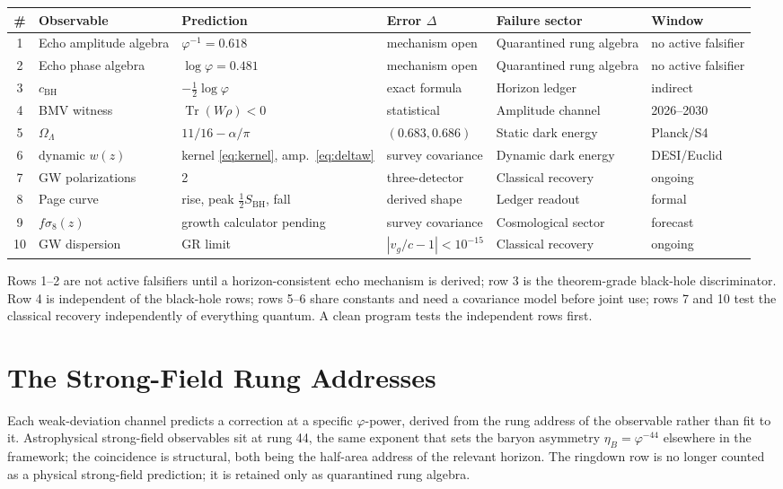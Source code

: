 \documentclass[11pt,letterpaper]{article}
\theoremstyle{definition}
\newcommand{\phiG}{\varphi}
\newcommand{\BH}{\mathrm{BH}}
\newcommand{\half}{\tfrac{1}{2}}
\DeclareMathOperator{\Tr}{Tr}
\begin{document}
\begin{center}
\footnotesize
\renewcommand{\arraystretch}{1.2}
\begin{tabular}{clp{2.9cm}p{2.1cm}p{2.3cm}l}
\toprule
\# & Observable & Prediction & Error $\Delta$
& Failure sector & Window \\
\midrule
1 & Echo amplitude algebra & $\phiG^{-1}=0.618$ & mechanism open
& Quarantined rung algebra & no active falsifier \\
2 & Echo phase algebra & $\log\phiG=0.481$ & mechanism open
& Quarantined rung algebra & no active falsifier \\
3 & $c_\BH$ & $-\half\log\phiG$ & exact formula
& Horizon ledger & indirect \\
4 & BMV witness & $\Tr(W\rho)<0$ & statistical
& Amplitude channel & 2026--2030 \\
5 & $\Omega_\Lambda$ & $11/16-\alpha/\pi$ & $(0.683,0.686)$
& Static dark energy & Planck/S4 \\
6 & dynamic $w(z)$ & kernel \eqref{eq:kernel}, amp.\
\eqref{eq:deltaw} & survey covariance
& Dynamic dark energy & DESI/Euclid \\
7 & GW polarizations & 2 & three-detector
& Classical recovery & ongoing \\
8 & Page curve & rise, peak $\half S_\BH$, fall & derived shape
& Ledger readout & formal \\
9 & $f\sigma_8(z)$ & growth calculator pending & survey covariance
& Cosmological sector & forecast \\
10 & GW dispersion & GR limit & $|v_g/c-1|<10^{-15}$
& Classical recovery & ongoing \\
\bottomrule
\end{tabular}
\end{center}

Rows 1--2 are not active falsifiers until a horizon-consistent echo
mechanism is derived; row 3 is the theorem-grade black-hole
discriminator.  Row 4 is independent of the black-hole rows; rows 5--6
share constants and need a covariance model before joint use; rows 7
and 10 test the classical recovery independently of everything quantum.
A clean program tests the independent rows first.

\section{The Strong-Field Rung Addresses}
\label{sec:rungs}

Each weak-deviation channel predicts a correction at a specific
$\phiG$-power, derived from the rung address of the observable rather
than fit to it.  Astrophysical strong-field observables sit at rung
44, the same exponent that sets the baryon asymmetry
$\eta_B=\phiG^{-44}$ elsewhere in the framework; the coincidence is
structural, both being the half-area address of the relevant horizon.
The ringdown row is no longer counted as a physical strong-field
prediction; it is retained only as quarantined rung algebra.
\end{document}
